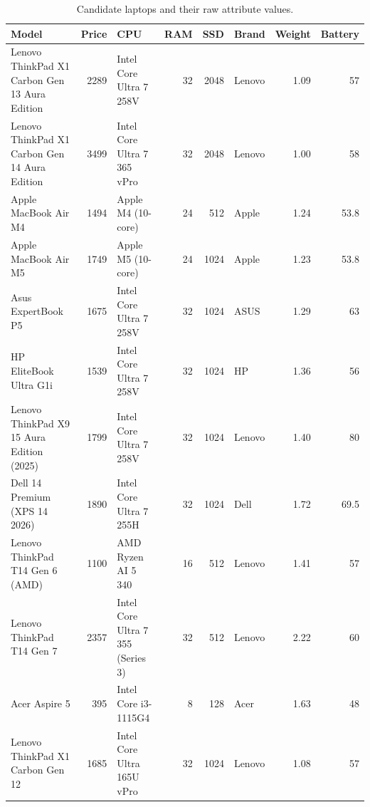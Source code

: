 \begin{table}[htbp]
\centering
\caption{Candidate laptops and their raw attribute values.}
\label{tab:decision-matrix}
\footnotesize
\setlength{\tabcolsep}{5pt}
\begin{tabular*}{\textwidth}{@{\extracolsep{\fill}}L{4.1cm}rL{3.7cm}rrL{1.6cm}rr@{}}
\toprule
Model & Price & CPU & RAM & SSD & Brand & Weight & Battery \\
\midrule
Lenovo ThinkPad X1 Carbon Gen 13 Aura Edition & 2289 & Intel Core Ultra 7 258V & 32 & 2048 & Lenovo & 1.09 & 57 \\
Lenovo ThinkPad X1 Carbon Gen 14 Aura Edition & 3499 & Intel Core Ultra 7 365 vPro & 32 & 2048 & Lenovo & 1.00 & 58 \\
Apple MacBook Air M4 & 1494 & Apple M4 (10-core) & 24 & 512 & Apple & 1.24 & 53.8 \\
Apple MacBook Air M5 & 1749 & Apple M5 (10-core) & 24 & 1024 & Apple & 1.23 & 53.8 \\
Asus ExpertBook P5 & 1675 & Intel Core Ultra 7 258V & 32 & 1024 & ASUS & 1.29 & 63 \\
HP EliteBook Ultra G1i & 1539 & Intel Core Ultra 7 258V & 32 & 1024 & HP & 1.36 & 56 \\
Lenovo ThinkPad X9 15 Aura Edition (2025) & 1799 & Intel Core Ultra 7 258V & 32 & 1024 & Lenovo & 1.40 & 80 \\
Dell 14 Premium (XPS 14 2026) & 1890 & Intel Core Ultra 7 255H & 32 & 1024 & Dell & 1.72 & 69.5 \\
Lenovo ThinkPad T14 Gen 6 (AMD) & 1100 & AMD Ryzen AI 5 340 & 16 & 512 & Lenovo & 1.41 & 57 \\
Lenovo ThinkPad T14 Gen 7 & 2357 & Intel Core Ultra 7 355 (Series 3) & 32 & 512 & Lenovo & 2.22 & 60 \\
Acer Aspire 5 & 395 & Intel Core i3-1115G4 & 8 & 128 & Acer & 1.63 & 48 \\
Lenovo ThinkPad X1 Carbon Gen 12 & 1685 & Intel Core Ultra 165U vPro & 32 & 1024 & Lenovo & 1.08 & 57 \\
\bottomrule
\end{tabular*}
\end{table}
